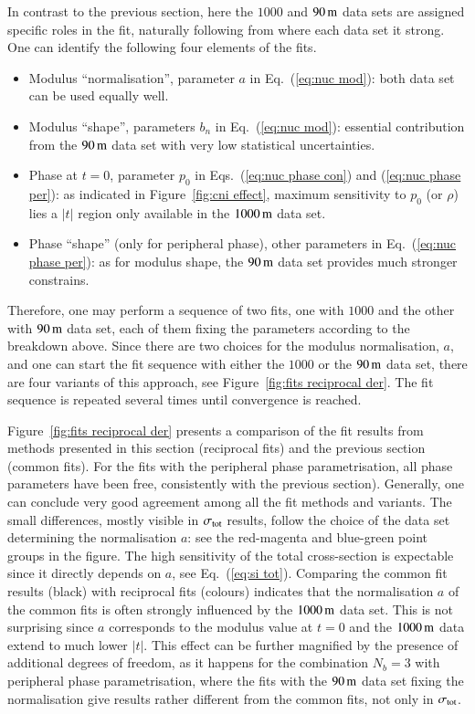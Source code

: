 In contrast to the previous section, here the $1000$ and $90\,{\rm m}$ data sets are assigned specific roles in the fit, naturally following from where each data set it strong. One can identify the following four elements of the fits.
\begin{itemize}
\item Modulus ``normalisation'', parameter $a$ in Eq.~(\ref{eq:nuc mod}): both data set can be used equally well.
\item Modulus ``shape'', parameters $b_n$ in Eq.~(\ref{eq:nuc mod}): essential contribution from the $90\,{\rm m}$ data set with very low statistical uncertainties.
\item Phase at $t = 0$, parameter $p_0$ in Eqs.~(\ref{eq:nuc phase con}) and (\ref{eq:nuc phase per}): as indicated in Figure~\ref{fig:cni effect}, maximum sensitivity to $p_0$ (or $\rho$) lies a $|t|$ region only available in the $1000\,{\rm m}$ data set.
\item Phase ``shape'' (only for peripheral phase), other parameters in Eq.~(\ref{eq:nuc phase per}): as for modulus shape, the $90\,{\rm m}$ data set provides much stronger constrains.
\end{itemize}
Therefore, one may perform a sequence of two fits, one with $1000$ and the other with $90\,{\rm m}$ data set, each of them fixing the parameters according to the breakdown above. Since there are two choices for the modulus normalisation, $a$, and one can start the fit sequence with either the $1000$ or the $90\,{\rm m}$ data set, there are four variants of this approach, see Figure~\ref{fig:fits reciprocal der}. The fit sequence is repeated several times until convergence is reached.

Figure~\ref{fig:fits reciprocal der} presents a comparison of the fit results from methods presented in this section (reciprocal fits) and the previous section (common fits). For the fits with the peripheral phase parametrisation, all phase parameters have been free, consistently with the previous section). Generally, one can conclude very good agreement among all the fit methods and variants. The small differences, mostly visible in $\sigma_{\rm tot}$ results, follow the choice of the data set determining the normalisation $a$: see the red-magenta and blue-green point groups in the figure. The high sensitivity of the total cross-section is expectable since it directly depends on $a$, see Eq.~(\ref{eq:si tot}). Comparing the common fit results (black) with reciprocal fits (colours) indicates that the normalisation $a$ of the common fits is often strongly influenced by the $1000\,{\rm m}$ data set. This is not surprising since $a$ corresponds to the modulus value at $t=0$ and the $1000\,{\rm m}$ data extend to much lower $|t|$. This effect can be further magnified by the presence of additional degrees of freedom, as it happens for the combination $N_b = 3$ with peripheral phase parametrisation, where the fits with the $90\,{\rm m}$ data set fixing the normalisation give results rather different from the common fits, not only in $\sigma_{\rm tot}$.

